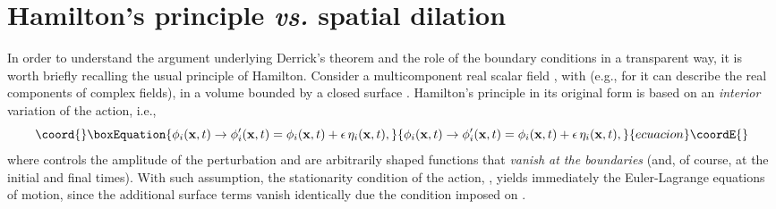 \documentclass[a4paper,prd,twocolumn,showpacs,amsmath]{revtex4}
\providecommand{\vecx}{{\bf x}}
\providecommand{\domega}{\partial \Omega}
\begin{document}

\section{Hamilton's principle {\em vs.} spatial dilation} \label{hamilt}
In order to understand the argument underlying Derrick's theorem and the role of the boundary conditions
in a transparent way, it is worth briefly recalling the usual principle of Hamilton. Consider a multicomponent
real scalar field \myHighlight{$\phi_i(\vecx,t)$}\coordHE{}, with \coordHE{} (e.g., for \coordHE{} it can describe the real components of
\coordHE{} complex fields), in a volume \myHighlight{$\Omega$}\coordHE{} bounded by a closed surface \myHighlight{$\domega$}\coordHE{}. Hamilton's principle
in its original form is based on an {\em interior} variation of the action, i.e.,
\begin{equation}\coord{}\boxEquation{ \label{phi_epsilon}
  \phi_i(\vecx,t) \to \phi_i'(\vecx,t) = \phi_i(\vecx,t) + \epsilon \, \eta_i(\vecx,t),
}{ \phi_i(\vecx,t) \to \phi_i'(\vecx,t) = \phi_i(\vecx,t) + \epsilon \, \eta_i(\vecx,t),
}{ecuacion}\coordE{}\end{equation}
where \myHighlight{$\epsilon$}\coordHE{} controls the amplitude of the perturbation and \myHighlight{$\eta_i(\vecx,t)$}\coordHE{} are arbitrarily shaped
functions that {\em vanish at the boundaries} \myHighlight{$\domega$}\coordHE{} (and, of course, at the initial
and final times). With such assumption, the stationarity condition of the action, \coordHE{}, yields
immediately the Euler-Lagrange equations of motion, since the additional surface terms vanish
identically due the condition imposed on \myHighlight{$\eta_i(\vecx,t)$}\coordHE{}.
\end{document}

